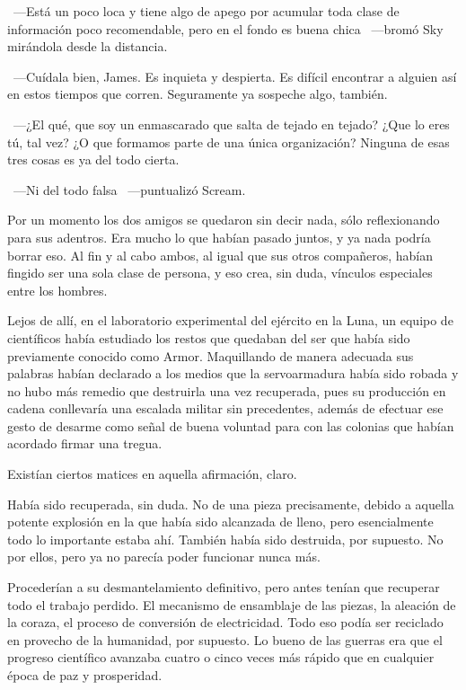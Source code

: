 ~---Está un poco loca y tiene algo de apego por acumular toda clase de información poco recomendable, pero en el fondo es buena chica ~---bromó Sky mirándola desde la distancia.

~---Cuídala bien, James. Es inquieta y despierta. Es difícil encontrar a alguien así en estos tiempos que corren. Seguramente ya sospeche algo, también.

~---¿El qué, que soy un enmascarado que salta de tejado en tejado? ¿Que lo eres tú, tal vez? ¿O que formamos parte de una única organización? Ninguna de esas tres cosas es ya del todo cierta.

~---Ni del todo falsa ~---puntualizó Scream.

Por un momento los dos amigos se quedaron sin decir nada, sólo reflexionando para sus adentros. Era mucho lo que habían pasado juntos, y ya nada podría borrar eso. Al fin y al cabo ambos, al igual que sus otros compañeros, habían fingido ser una sola clase de persona, y eso crea, sin duda, vínculos especiales entre los hombres.

\bigskip\noindent
Lejos de allí, en el laboratorio experimental del ejército en la Luna, un equipo de científicos había estudiado los restos que quedaban del ser que había sido previamente conocido como Armor. Maquillando de manera adecuada sus palabras habían declarado a los medios que la servoarmadura había sido robada y no hubo más remedio que destruirla una vez recuperada, pues su producción en cadena conllevaría una escalada militar sin precedentes, además de efectuar ese gesto de desarme como señal de buena voluntad para con las colonias que habían acordado firmar una tregua.

Existían ciertos matices en aquella afirmación, claro.

Había sido recuperada, sin duda. No de una pieza precisamente, debido a aquella potente explosión en la que había sido alcanzada de lleno, pero esencialmente todo lo importante estaba ahí. También había sido destruida, por supuesto. No por ellos, pero ya no parecía poder funcionar nunca más.

Procederían a su desmantelamiento definitivo, pero antes tenían que recuperar todo el trabajo perdido. El mecanismo de ensamblaje de las piezas, la aleación de la coraza, el proceso de conversión de electricidad. Todo eso podía ser reciclado en provecho de la humanidad, por supuesto. Lo bueno de las guerras era que el progreso científico avanzaba cuatro o cinco veces más rápido que en cualquier época de paz y prosperidad.

